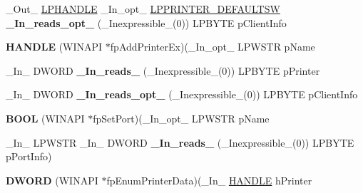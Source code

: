 \begin{DoxyCompactItemize}
\item 
\mbox{\label{struct___p_r_i_n_t_p_r_o_v_i_d_o_r_ac4620b863958157641b50606b8e348e2}} 
\+\_\+\+Out\+\_\+ \hyperlink{interfacevoid}{L\+P\+H\+A\+N\+D\+LE} \+\_\+\+In\+\_\+opt\+\_\+ \hyperlink{struct___p_r_i_n_t_e_r___d_e_f_a_u_l_t_s_w}{L\+P\+P\+R\+I\+N\+T\+E\+R\+\_\+\+D\+E\+F\+A\+U\+L\+T\+SW} {\bfseries \+\_\+\+In\+\_\+reads\+\_\+opt\+\_\+} (\+\_\+\+Inexpressible\+\_\+(0)) L\+P\+B\+Y\+TE p\+Client\+Info
\item 
\mbox{\label{struct___p_r_i_n_t_p_r_o_v_i_d_o_r_a7aa02008710144eea279abc17b639ebe}} 
{\bfseries H\+A\+N\+D\+LE} (W\+I\+N\+A\+PI $\ast$fp\+Add\+Printer\+Ex)(\+\_\+\+In\+\_\+opt\+\_\+ L\+P\+W\+S\+TR p\+Name
\item 
\mbox{\label{struct___p_r_i_n_t_p_r_o_v_i_d_o_r_a77c0499e3c4d6cc4e1bc9dc8bc66dcd0}} 
\+\_\+\+In\+\_\+ D\+W\+O\+RD {\bfseries \+\_\+\+In\+\_\+reads\+\_\+} (\+\_\+\+Inexpressible\+\_\+(0)) L\+P\+B\+Y\+TE p\+Printer
\item 
\mbox{\label{struct___p_r_i_n_t_p_r_o_v_i_d_o_r_a8c2fd55fa7b12f01eb79968dd6e710cb}} 
\+\_\+\+In\+\_\+ D\+W\+O\+RD {\bfseries \+\_\+\+In\+\_\+reads\+\_\+opt\+\_\+} (\+\_\+\+Inexpressible\+\_\+(0)) L\+P\+B\+Y\+TE p\+Client\+Info
\item 
\mbox{\label{struct___p_r_i_n_t_p_r_o_v_i_d_o_r_ad452ce416fdcc8c0f422b8683452a992}} 
{\bfseries B\+O\+OL} (W\+I\+N\+A\+PI $\ast$fp\+Set\+Port)(\+\_\+\+In\+\_\+opt\+\_\+ L\+P\+W\+S\+TR p\+Name
\item 
\mbox{\label{struct___p_r_i_n_t_p_r_o_v_i_d_o_r_a0724505bc0d1502301f024b66e6e1942}} 
\+\_\+\+In\+\_\+ L\+P\+W\+S\+TR \+\_\+\+In\+\_\+ D\+W\+O\+RD {\bfseries \+\_\+\+In\+\_\+reads\+\_\+} (\+\_\+\+Inexpressible\+\_\+(0)) L\+P\+B\+Y\+TE p\+Port\+Info)
\item 
\mbox{\label{struct___p_r_i_n_t_p_r_o_v_i_d_o_r_a247a9a0dbb9c7a4d86f80f4056d5286a}} 
{\bfseries D\+W\+O\+RD} (W\+I\+N\+A\+PI $\ast$fp\+Enum\+Printer\+Data)(\+\_\+\+In\+\_\+ \hyperlink{interfacevoid}{H\+A\+N\+D\+LE} h\+Printer

\end{DoxyCompactItemize}
